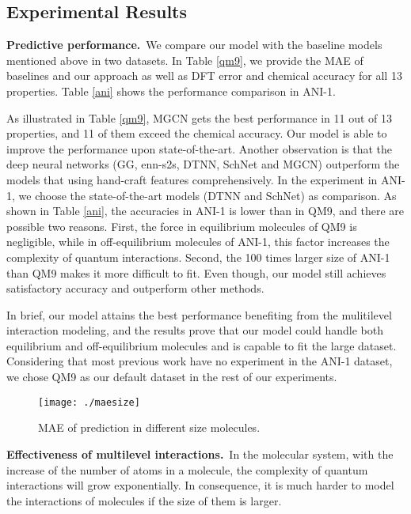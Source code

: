 \documentclass[letterpaper]{article} \usepackage{bm}
\begin{document}
        


\subsection{Experimental Results}
\textbf{Predictive performance.}\ We compare our model with the baseline models mentioned above in two datasets. In Table \ref{qm9}, we provide the MAE of baselines and our approach as well as DFT error and chemical accuracy for all 13 properties. Table \ref{ani} shows the performance comparison in ANI-1.

As illustrated in Table \ref{qm9}, MGCN gets the best performance in 11 out of 13 properties, and 11 of them exceed the chemical accuracy. Our model is able to improve the performance upon state-of-the-art. Another observation is that the deep neural networks (GG, enn-s2s, DTNN, SchNet and MGCN) outperform the models that using hand-craft features comprehensively. 
In the experiment in ANI-1, we choose the state-of-the-art models (DTNN and SchNet) as comparison. As shown in Table \ref{ani}, the accuracies in ANI-1 is lower than in QM9, and there are possible two reasons. First, the force in equilibrium molecules of QM9 is negligible, while in off-equilibrium molecules of ANI-1, this factor increases the complexity of quantum interactions. Second, the 100 times larger size of ANI-1 than QM9 makes it more difficult to ﬁt. Even though, our model still achieves satisfactory accuracy and outperform other methods.

In brief, our model attains the best performance benefiting from the mulitilevel interaction modeling, and the results prove that our model could handle both equilibrium and off-equilibrium molecules and is capable to fit the large dataset. Considering that most previous work have no experiment in the ANI-1 dataset, we chose QM9 as our default dataset in the rest of our experiments.  



\begin{figure}[tb]
	
    \centerline{\texttt{[image: ./maesize]}}

    \caption{MAE of prediction in different size molecules.}
    \label{maeatom}
\end{figure} 


 \textbf{Effectiveness of multilevel interactions.}\ In the molecular system, with the increase of the number of atoms in a molecule, the complexity of quantum interactions will grow exponentially. In consequence, it is much harder to model the interactions of molecules if the size of them is larger.
 
\end{document}
